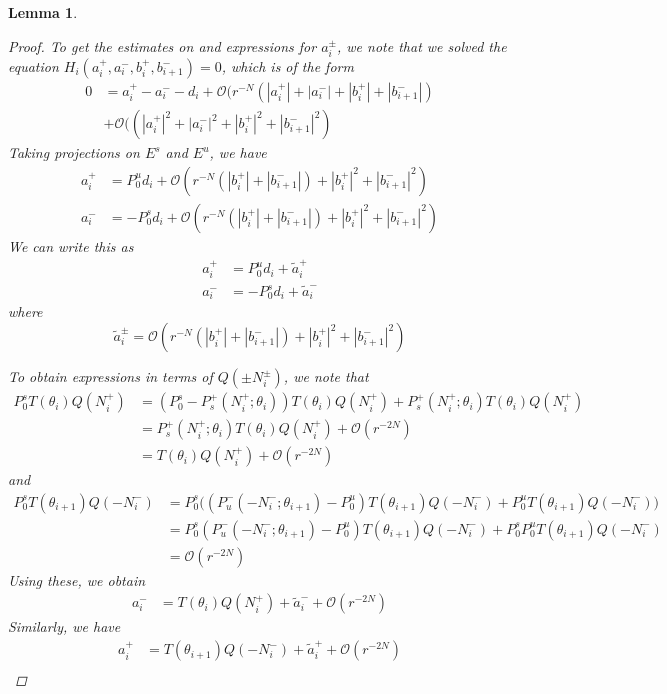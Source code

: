 \documentclass[12pt]{article}
\newtheorem{lemma}{Lemma}
\begin{document}
\begin{lemma}
\begin{proof}
To get the estimates on and expressions for $a_i^\pm$, we note that we solved the equation $H_i(a_i^+, a_i^-, b_i^+, b_{i+1}^-) = 0$, which is of the form
\begin{align*}
0 &= a_i^+ - a_i^- - d_i + \mathcal{O}(r^{-N}(|a_i^+|+|a_i^-|+|b_i^+|+|b_{i+1}^-|)\\
&+ \mathcal{O}((|a_i^+|^2+|a_i^-|^2+|b_i^+|^2+|b_{i+1}^-|^2)
\end{align*}
Taking projections on $E^s$ and $E^u$, we have
\begin{align*}
a_i^+ &= P_0^u d_i + \mathcal{O}(r^{-N}(|b_i^+|+|b_{i+1}^-|) + |b_i^+|^2+|b_{i+1}^-|^2) \\
a_i^- &= -P_0^s d_i + \mathcal{O}(r^{-N}(|b_i^+|+|b_{i+1}^-|) + |b_i^+|^2+|b_{i+1}^-|^2)
\end{align*}
We can write this as 
\begin{align*}
a_i^+ &= P_0^u d_i + \tilde{a}_i^+ \\
a_i^- &= -P_0^s d_i + \tilde{a}_i^-
\end{align*}
where
\[
\tilde{a}_i^\pm = \mathcal{O}(r^{-N}(|b_i^+|+|b_{i+1}^-|) + |b_i^+|^2+|b_{i+1}^-|^2) 
\]

To obtain expressions in terms of $Q(\pm N_i^\pm)$, we note that
\begin{align*}
P_0^s T(\theta_i) Q(N_i^+) &= (P_0^s - P_s^+(N_i^+; \theta_i)) T(\theta_i) Q(N_i^+) + P_s^+(N_i^+; \theta_i) T(\theta_i) Q(N_i^+) \\
&= P_s^+(N_i^+; \theta_i) T(\theta_i) Q(N_i^+) + \mathcal{O}(r^{-2N}) \\
&= T(\theta_i) Q(N_i^+) + \mathcal{O}(r^{-2N}) 
\end{align*}
and 
\begin{align*}
P_0^s T(\theta_{i+1}) Q(-N_i^-) 
&= P_0^s \Big( ( P_u^-(-N_i^-; \theta_{i+1}) - P_0^u) T(\theta_{i+1}) Q(-N_i^-) + P_0^u T(\theta_{i+1}) Q(-N_i^-) \Big) \\
&= P_0^s ( P_u^-(-N_i^-; \theta_{i+1}) - P_0^u) T(\theta_{i+1}) Q(-N_i^-) + P_0^s P_0^u T(\theta_{i+1}) Q(-N_i^-) \\
&= \mathcal{O}(r^{-2N})
\end{align*}
Using these, we obtain
\begin{align*}
a_i^- &= T(\theta_i) Q(N_i^+) + \tilde{a}_i^- + \mathcal{O}(r^{-2N})
\end{align*}
Similarly, we have
\begin{align*}
a_i^+ &= T(\theta_{i+1}) Q(-N_i^-) + \tilde{a}_i^+ + \mathcal{O}(r^{-2N}) \\
\end{align*}
\end{proof}
\end{lemma}
\end{document}
